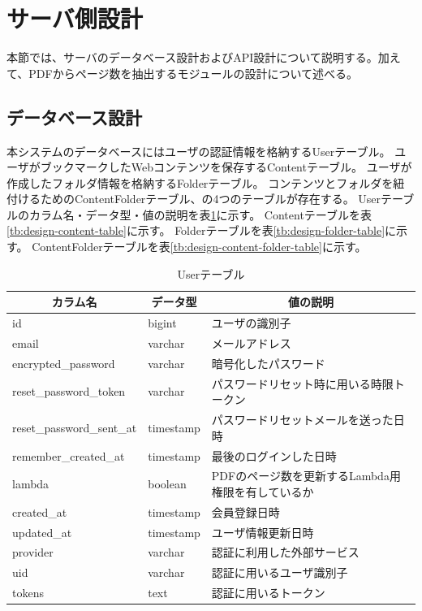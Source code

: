 \section{サーバ側設計}
本節では、サーバのデータベース設計およびAPI設計について説明する。加えて、PDFからページ数を抽出するモジュールの設計について述べる。

\subsection{データベース設計}
本システムのデータベースにはユーザの認証情報を格納するUserテーブル。
ユーザがブックマークしたWebコンテンツを保存するContentテーブル。
ユーザが作成したフォルダ情報を格納するFolderテーブル。
コンテンツとフォルダを紐付けるためのContentFolderテーブル、の4つのテーブルが存在する。
Userテーブルのカラム名・データ型・値の説明を表\ref{tb:design-user-table}に示す。
Contentテーブルを表\ref{tb:design-content-table}に示す。
Folderテーブルを表\ref{tb:design-folder-table}に示す。
ContentFolderテーブルを表\ref{tb:design-content-folder-table}に示す。

\begin{table}[htbp]
  \label{tb:design-user-table}
  \caption{Userテーブル}
  \begin{center}
    \begin{tabular}{|l|l|l|}
      \hline
      \multicolumn{1}{|c|}{\textbf{カラム名}} & \multicolumn{1}{|c|}{\textbf{データ型}} & \multicolumn{1}{|c|}{\textbf{値の説明}} \\\hline
      id & bigint & ユーザの識別子 \\\hline
      email & varchar & メールアドレス \\\hline
      encrypted\_password & varchar & 暗号化したパスワード \\\hline
      reset\_password\_token & varchar & パスワードリセット時に用いる時限トークン \\\hline
      reset\_password\_sent\_at & timestamp & パスワードリセットメールを送った日時 \\\hline
      remember\_created\_at & timestamp & 最後のログインした日時 \\\hline
      lambda & boolean & PDFのページ数を更新するLambda用権限を有しているか \\\hline
      created\_at & timestamp & 会員登録日時 \\\hline
      updated\_at & timestamp & ユーザ情報更新日時 \\\hline
      provider & varchar & 認証に利用した外部サービス \\\hline
      uid & varchar & 認証に用いるユーザ識別子 \\\hline
      tokens & text & 認証に用いるトークン \\\hline
    \end{tabular}
  \end{center}
\end{table}

